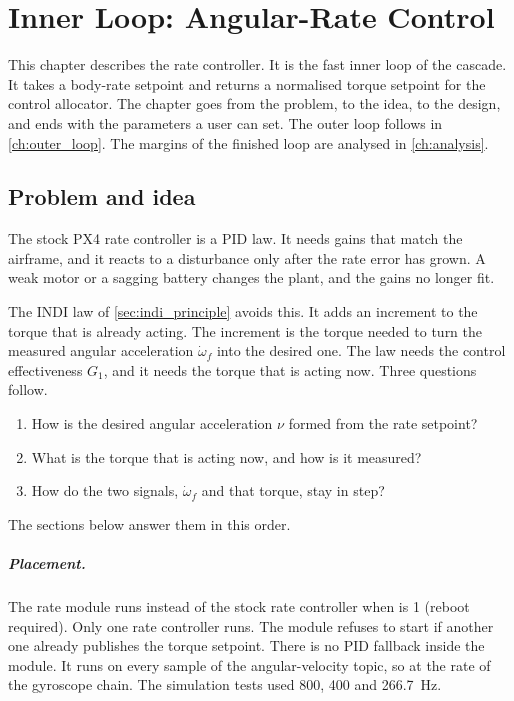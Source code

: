 \chapter{Inner Loop: Angular-Rate Control}\label{ch:inner_loop}

This chapter describes the rate controller.
It is the fast inner loop of the cascade.
It takes a body-rate setpoint and returns a normalised torque setpoint for the control allocator.
The chapter goes from the problem, to the idea, to the design, and ends with the parameters a user can set.
The outer loop follows in \cref{ch:outer_loop}.
The margins of the finished loop are analysed in \cref{ch:analysis}.

\section{Problem and idea}\label{sec:inner_problem}

The stock PX4 rate controller is a PID law.
It needs gains that match the airframe, and it reacts to a disturbance only after the rate error has grown.
A weak motor or a sagging battery changes the plant, and the gains no longer fit.

The INDI law of \cref{sec:indi_principle} avoids this.
It adds an increment to the torque that is already acting.
The increment is the torque needed to turn the measured angular acceleration $\dot\omega_f$ into the desired one.
The law needs the control effectiveness $G_1$, and it needs the torque that is acting now.
Three questions follow.
\begin{enumerate}
  \item How is the desired angular acceleration $\nu$ formed from the rate setpoint?
  \item What is the torque that is acting now, and how is it measured?
  \item How do the two signals, $\dot\omega_f$ and that torque, stay in step?
\end{enumerate}
The sections below answer them in this order.

\paragraph{Placement.}
The rate module runs instead of the stock rate controller when  is 1 (reboot required).
Only one rate controller runs.
The module refuses to start if another one already publishes the torque setpoint.
There is no PID fallback inside the module.
It runs on every sample of the angular-velocity topic, so at the rate of the gyroscope chain.
The simulation tests used 800, 400 and 266.7~Hz.

